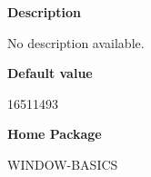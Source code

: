 
{\bf Description}

No description available.

 
{\bf Default value}

16511493

 
{\bf Home Package}

WINDOW-BASICS

